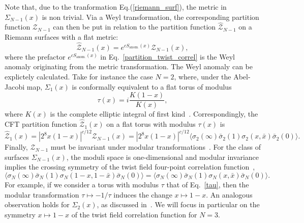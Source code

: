 \documentclass[a4paper,11pt]{article}
\begin{document}
\noindent Note that, due to the tranformation Eq.(\ref{riemann_surf}), the metric in $\Sigma_{N-1}(x)$ is non trivial.  Via a Weyl transformation, the corresponding partition function $\mathcal{Z}_{N-1}$ can then be put in relation to the partition function $\mathcal{\hat{Z}}_{N-1}$ on a Riemann surfaces with a flat metric\cite{Lunin}:  
\begin{equation}\label{partition_twist_correl}
 \mathcal{\hat{Z}}_{N-1}(x)=e^{cS_{\text{anom.}}(x)} \mathcal{Z}_{N-1}(x),
\end{equation}
where the prefactor $e^{cS_{\text{anom.}}(x)}$ in Eq.~\eqref{partition_twist_correl} is the Weyl anomaly originating from the metric transformation.
\noindent The Weyl anomaly can be explictely calculated. Take for instance the case $N=2$, where, under the Abel-Jacobi map, $\Sigma_{1}(x)$ is conformally equivalent to a flat torus of modulus 
\begin{equation}\label{tau}
 \tau(x)=i\frac{K(1-x)}{K(x)}, 
\end{equation}
where $K(x)$ is the complete elliptic integral of first 
kind~\cite{Whittaker}. Correspondingly, the CFT partition function $\mathcal{\hat{Z}}_1(x)$ on a flat torus 
with modulus $\tau(x)$ is~\cite{Lunin}
\begin{equation}\label{partition_torus_twist}
 \mathcal{\hat{Z}}_1(x)=|2^8 x(1-x)|^{c/12} \mathcal{Z}_{N-1}(x)=|2^8 x(1-x)|^{c/12} \langle \sigma_2 (\infty)\bar{\sigma}_2(1)\sigma_2(x, \bar{x})\bar{\sigma}_2(0)\rangle.
\end{equation}
Finally, $\mathcal{Z}_{N-1}$ must be invariant  
under modular transformations~\cite{CardyMod, Cappelli, Cappelli2}.  For the class of surfaces $\Sigma_{N-1}(x)$, the moduli space is one-dimensional and modular invariance implies the crossing
symmetry of the twist field four-point correlation function~\cite{Cardy},
\begin{equation}\label{cross_symmetry}
 \langle \sigma_N(\infty)\bar{\sigma}_N(1)\sigma_N(1-x, 1-\bar{x})\bar{\sigma}_N(0)\rangle=
 \langle \sigma_N(\infty)\bar{\sigma}_N(1)\sigma_N(x, \bar{x})\bar{\sigma}_N(0)\rangle. 
\end{equation}
For example, if we consider a torus with modulus $\tau$ that of Eq.~\eqref{tau},
then the modular transformation $\tau\mapsto-1/\tau$ induces the change
$x\mapsto 1-x$. An analogous observation holds for $\Sigma_{2}(x)$, as discussed in~\cite{Cardy}.
 We will focus in particular on 
the symmetry $x\mapsto 1-x$ of the twist field correlation function for $N=3$. 
\end{document}
